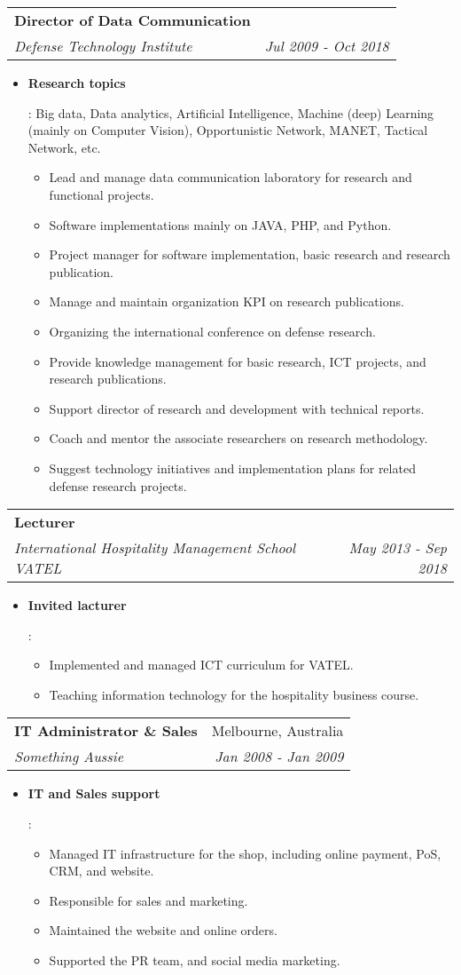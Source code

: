 \documentclass[letterpaper,11pt]{article}
\makeatletter
\newcommand{\resumeItem}[2]{
  \item\small{
    \textbf{#1}{: #2 \vspace{-2pt}}
  }
}
\newcommand{\resumeSubheading}[4]{
  \vspace{-1pt}\item
    \begin{tabular*}{0.97\textwidth}[t]{l@{\extracolsep{\fill}}r}
      \textbf{#1} & #2 \\
      \textit{\small#3} & \textit{\small #4} \\
    \end{tabular*}\vspace{-5pt}
}
\newcommand{\resumeItemListStart}{\begin{itemize}}
\newcommand{\resumeItemListEnd}{\end{itemize}\vspace{-5pt}}
\makeatother
\begin{document}
    \resumeSubheading
      {Director of Data Communication}{}
      {Defense Technology Institute}{Jul 2009 - Oct 2018}
      \resumeItemListStart
        \resumeItem{Research topics}
          {Big data, Data analytics, Artificial Intelligence, Machine (deep) Learning (mainly on Computer Vision), Opportunistic Network, MANET, Tactical Network, etc.
          \begin{itemize}
            \item Lead and manage data communication laboratory for research and functional projects.
            \item Software implementations mainly on JAVA, PHP, and Python.
            \item Project manager for software implementation, basic research and research publication.
            \item Manage and maintain organization KPI on research publications.
            \item Organizing the international conference on defense research.
            \item Provide knowledge management for basic research, ICT projects, and research publications.
            \item Support director of research and development with technical reports.
            \item Coach and mentor the associate researchers on research methodology.
            \item Suggest technology initiatives and implementation plans for related defense research projects.
          \end{itemize}
          }
      \resumeItemListEnd

    \resumeSubheading
      {Lecturer}{}
      {International Hospitality Management School VATEL}{May 2013 - Sep 2018}
      \resumeItemListStart
        \resumeItem{Invited lacturer}
          {\begin{itemize}
              \item Implemented and managed ICT curriculum for VATEL.
              \item Teaching information technology for the hospitality business course.
            \end{itemize}}
      \resumeItemListEnd

      \resumeSubheading
      {IT Administrator \& Sales}{Melbourne, Australia}
      {Something Aussie}{Jan 2008 - Jan 2009}
      \resumeItemListStart
        \resumeItem{IT and Sales support}
          {\begin{itemize}
            \item Managed IT infrastructure for the shop, including online payment, PoS, CRM, and website.
            \item Responsible for sales and marketing.
            \item Maintained the website and online orders.
            \item Supported the PR team, and social media marketing.
          \end{itemize}}
      \resumeItemListEnd
\end{document}

